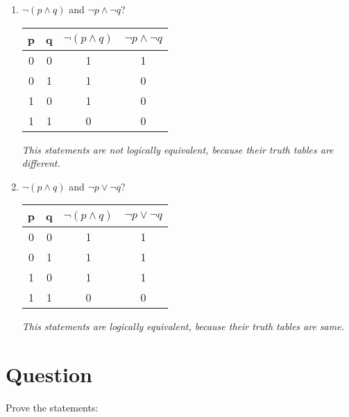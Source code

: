 \documentclass[a4paper,11pt]{article}
\begin{document}
\begin{enumerate}[label=\alph*)]
  \item
  $\neg (p \wedge q)$ and $\neg p \wedge \neg q$?

  \begin{tabular}{|cc|cc|}
    \hline
    p & q & $\neg (p \wedge q)$ & $\neg p \wedge \neg q$\\
    \hline
    0 & 0 & 1 & 1\\
    0 & 1 & 1 & 0\\
    1 & 0 & 1 & 0\\
    1 & 1 & 0 & 0\\
    \hline
  \end{tabular}

  \emph{This statements are not logically equivalent, because their truth tables are different.}

  \item
  $\neg (p \wedge q)$ and $\neg p \vee \neg q$?

  \begin{tabular}{|cc|cc|}
    \hline
    p & q & $\neg (p \wedge q)$ & $\neg p \vee \neg q$\\
    \hline
    0 & 0 & 1 & 1\\
    0 & 1 & 1 & 1\\
    1 & 0 & 1 & 1\\
    1 & 1 & 0 & 0\\
    \hline
  \end{tabular}

  \emph{This statements are logically equivalent, because their truth tables are same.}

\end{enumerate}

\section{Question}
\label{sec:Question}
Prove the statements:
\end{document}
